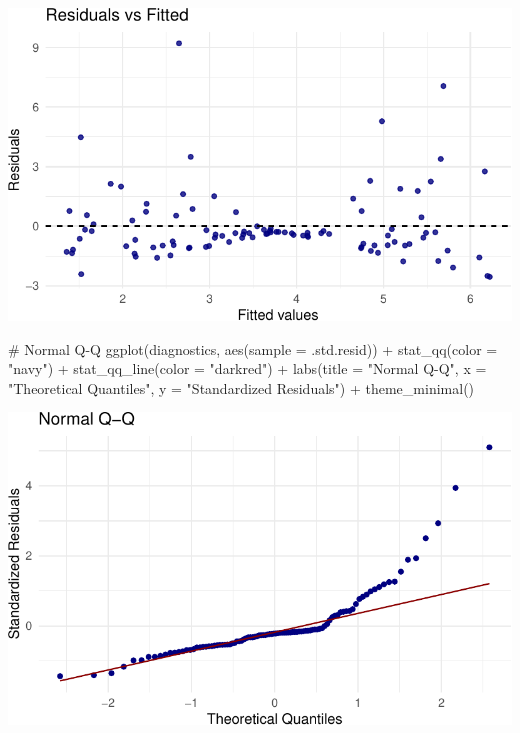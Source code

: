\documentclass[
  11pt,
]{article}
\newenvironment{Shaded}{\begin{snugshade}}{\end{snugshade}}
\newcommand{\AttributeTok}[1]{\textcolor[rgb]{0.40,0.45,0.13}{#1}}
\newcommand{\CommentTok}[1]{\textcolor[rgb]{0.37,0.37,0.37}{#1}}
\newcommand{\FunctionTok}[1]{\textcolor[rgb]{0.28,0.35,0.67}{#1}}
\newcommand{\NormalTok}[1]{\textcolor[rgb]{0.00,0.23,0.31}{#1}}
\newcommand{\SpecialCharTok}[1]{\textcolor[rgb]{0.37,0.37,0.37}{#1}}
\newcommand{\StringTok}[1]{\textcolor[rgb]{0.13,0.47,0.30}{#1}}
\begin{document}
\includegraphics{HW-4-CODE-and-ANSWERS_files/figure-pdf/unnamed-chunk-1-1.pdf}

\begin{Shaded}
\begin{Highlighting}[]
\CommentTok{\# Normal Q{-}Q}
\FunctionTok{ggplot}\NormalTok{(diagnostics, }\FunctionTok{aes}\NormalTok{(}\AttributeTok{sample =}\NormalTok{ .std.resid)) }\SpecialCharTok{+}
  \FunctionTok{stat\_qq}\NormalTok{(}\AttributeTok{color =} \StringTok{"navy"}\NormalTok{) }\SpecialCharTok{+}
  \FunctionTok{stat\_qq\_line}\NormalTok{(}\AttributeTok{color =} \StringTok{"darkred"}\NormalTok{) }\SpecialCharTok{+}
  \FunctionTok{labs}\NormalTok{(}\AttributeTok{title =} \StringTok{"Normal Q{-}Q"}\NormalTok{, }\AttributeTok{x =} \StringTok{"Theoretical Quantiles"}\NormalTok{, }
       \AttributeTok{y =} \StringTok{"Standardized Residuals"}\NormalTok{) }\SpecialCharTok{+}
  \FunctionTok{theme\_minimal}\NormalTok{()}
\end{Highlighting}
\end{Shaded}

\includegraphics{HW-4-CODE-and-ANSWERS_files/figure-pdf/unnamed-chunk-2-1.pdf}
\end{document}
